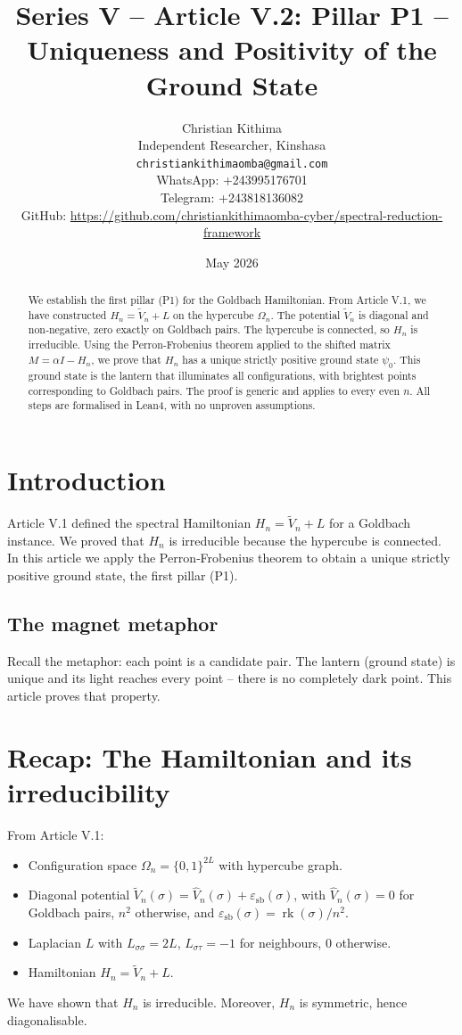 \documentclass[11pt,a4paper]{article}
\title{Series V – Article V.2: Pillar P1 – Uniqueness and Positivity of the Ground State}
\author{Christian Kithima \\
Independent Researcher, Kinshasa \\
\texttt{christiankithimaomba@gmail.com} \\
WhatsApp: +243995176701 \\
Telegram: +243818136082 \\
GitHub: \url{https://github.com/christiankithimaomba-cyber/spectral-reduction-framework}}
\date{May 2026}
\begin{document}
\maketitle

\begin{abstract}
We establish the first pillar (P1) for the Goldbach Hamiltonian. From Article V.1, we have constructed \(H_n = \tilde{V}_n + L\) on the hypercube \(\Omega_n\). The potential \(\tilde{V}_n\) is diagonal and non‑negative, zero exactly on Goldbach pairs. The hypercube is connected, so \(H_n\) is irreducible. Using the Perron‑Frobenius theorem applied to the shifted matrix \(M = \alpha I - H_n\), we prove that \(H_n\) has a unique strictly positive ground state \(\psi_0\). This ground state is the lantern that illuminates all configurations, with brightest points corresponding to Goldbach pairs. The proof is generic and applies to every even \(n\). All steps are formalised in Lean4, with no unproven assumptions.
\end{abstract}

\tableofcontents

\section{Introduction}

Article V.1 defined the spectral Hamiltonian \(H_n = \tilde{V}_n + L\) for a Goldbach instance. We proved that \(H_n\) is irreducible because the hypercube is connected. In this article we apply the Perron‑Frobenius theorem to obtain a unique strictly positive ground state, the first pillar (P1).

\subsection{The magnet metaphor}

Recall the metaphor: each point is a candidate pair. The lantern (ground state) is unique and its light reaches every point – there is no completely dark point. This article proves that property.

\section{Recap: The Hamiltonian and its irreducibility}

From Article V.1:
\begin{itemize}
\item Configuration space \(\Omega_n = \{0,1\}^{2L}\) with hypercube graph.
\item Diagonal potential \(\tilde{V}_n(\sigma) = \hat{V}_n(\sigma) + \varepsilon_{\text{sb}}(\sigma)\), with \(\hat{V}_n(\sigma)=0\) for Goldbach pairs, \(n^2\) otherwise, and \(\varepsilon_{\text{sb}}(\sigma)=\operatorname{rk}(\sigma)/n^2\).
\item Laplacian \(L\) with \(L_{\sigma\sigma}=2L\), \(L_{\sigma\tau}=-1\) for neighbours, \(0\) otherwise.
\item Hamiltonian \(H_n = \tilde{V}_n + L\).
\end{itemize}
We have shown that \(H_n\) is irreducible. Moreover, \(H_n\) is symmetric, hence diagonalisable.
\end{document}
